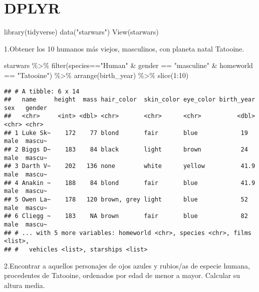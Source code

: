 \documentclass[
]{book}
\newenvironment{Shaded}{\begin{snugshade}}{\end{snugshade}}
\newcommand{\DecValTok}[1]{\textcolor[rgb]{0.00,0.00,0.81}{#1}}
\newcommand{\FunctionTok}[1]{\textcolor[rgb]{0.00,0.00,0.00}{#1}}
\newcommand{\NormalTok}[1]{#1}
\newcommand{\SpecialCharTok}[1]{\textcolor[rgb]{0.00,0.00,0.00}{#1}}
\newcommand{\StringTok}[1]{\textcolor[rgb]{0.31,0.60,0.02}{#1}}
\begin{document}
\hypertarget{dplyr}{%
\section{DPLYR}\label{dplyr}}

\begin{Shaded}
\begin{Highlighting}[]
\FunctionTok{library}\NormalTok{(tidyverse)}
\FunctionTok{data}\NormalTok{(}\StringTok{"starwars"}\NormalTok{)}
\FunctionTok{View}\NormalTok{(starwars)}
\end{Highlighting}
\end{Shaded}

1.Obtener los 10 humanos más viejos, masculinos, con planeta natal Tatooine.

\begin{Shaded}
\begin{Highlighting}[]
\NormalTok{starwars }\SpecialCharTok{\%\textgreater{}\%}
 \FunctionTok{filter}\NormalTok{(species}\SpecialCharTok{==}\StringTok{"Human"} \SpecialCharTok{\&}\NormalTok{ gender }\SpecialCharTok{==} \StringTok{"masculine"} \SpecialCharTok{\&}\NormalTok{ homeworld }\SpecialCharTok{==} \StringTok{"Tatooine"}\NormalTok{) }\SpecialCharTok{\%\textgreater{}\%}
 \FunctionTok{arrange}\NormalTok{(birth\_year) }\SpecialCharTok{\%\textgreater{}\%}
 \FunctionTok{slice}\NormalTok{(}\DecValTok{1}\SpecialCharTok{:}\DecValTok{10}\NormalTok{)}
\end{Highlighting}
\end{Shaded}

\begin{verbatim}
## # A tibble: 6 x 14
##   name     height  mass hair_color  skin_color eye_color birth_year sex   gender
##   <chr>     <int> <dbl> <chr>       <chr>      <chr>          <dbl> <chr> <chr> 
## 1 Luke Sk~    172    77 blond       fair       blue            19   male  mascu~
## 2 Biggs D~    183    84 black       light      brown           24   male  mascu~
## 3 Darth V~    202   136 none        white      yellow          41.9 male  mascu~
## 4 Anakin ~    188    84 blond       fair       blue            41.9 male  mascu~
## 5 Owen La~    178   120 brown, grey light      blue            52   male  mascu~
## 6 Cliegg ~    183    NA brown       fair       blue            82   male  mascu~
## # ... with 5 more variables: homeworld <chr>, species <chr>, films <list>,
## #   vehicles <list>, starships <list>
\end{verbatim}

2.Encontrar a aquellos personajes de ojos azules y rubios/as de especie humana, procedentes de Tatooine, ordenados por edad de menor a mayor. Calcular su altura media.
\end{document}

